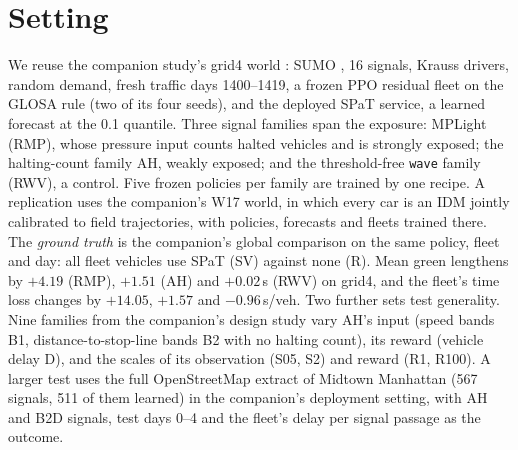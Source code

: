 \section{Setting}\label{sec:setting}
We reuse the companion study's grid4 world \cite{nguyen2026tsi}: SUMO \cite{lopez2018}, 16 signals, Krauss drivers, random demand,
fresh traffic days 1400--1419, a frozen PPO residual fleet on the GLOSA rule (two of its four seeds), and the deployed SPaT service, a
learned forecast at the 0.1 quantile. Three signal families span the exposure: MPLight (RMP), whose pressure input counts halted
vehicles and is strongly exposed; the halting-count family AH, weakly exposed; and the threshold-free \texttt{wave} family (RWV), a
control. Five frozen policies per family are trained by one recipe. A replication uses the companion's W17 world, in which every car is
an IDM jointly calibrated to field trajectories, with policies, forecasts and fleets trained there. The \emph{ground truth} is the
companion's global comparison on the same policy, fleet and day: all fleet vehicles use SPaT (SV) against none (R). Mean green
lengthens by $+4.19$ (RMP), $+1.51$ (AH) and $+0.02$\,s (RWV) on grid4, and the fleet's time loss changes by $+14.05$, $+1.57$ and
$-0.96$\,s/veh. Two further sets test generality. Nine families from the companion's design study vary AH's input (speed bands B1,
distance-to-stop-line bands B2 with no halting count), its reward (vehicle delay D), and the scales of its observation (S05, S2) and
reward (R1, R100). A larger test uses the full OpenStreetMap extract of Midtown Manhattan (567 signals, 511 of them learned) in the
companion's deployment setting, with AH and B2D signals, test days 0--4 and the fleet's delay per signal passage as the outcome.

